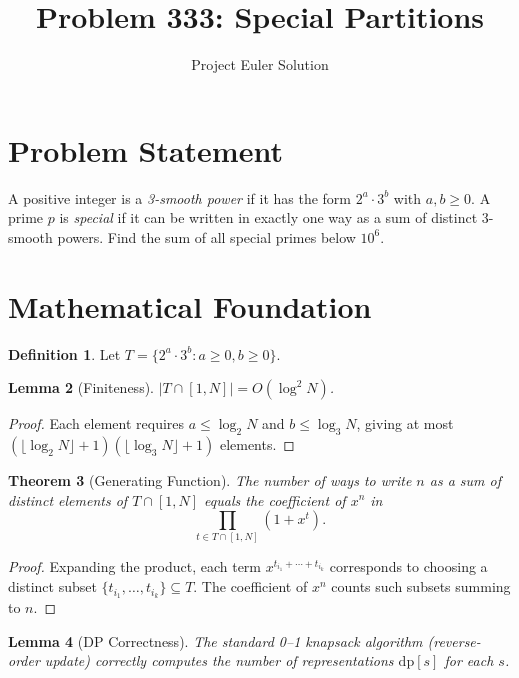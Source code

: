 \documentclass[12pt]{article}
\title{Problem 333: Special Partitions}
\author{Project Euler Solution}
\date{}
\newtheorem{theorem}{Theorem}
\newtheorem{lemma}[theorem]{Lemma}
\theoremstyle{definition}
\newtheorem{definition}[theorem]{Definition}
\begin{document}
\maketitle

\section{Problem Statement}

A positive integer is a \emph{3-smooth power} if it has the form $2^a \cdot 3^b$ with $a, b \ge 0$. A prime $p$ is \emph{special} if it can be written in exactly one way as a sum of distinct 3-smooth powers. Find the sum of all special primes below $10^6$.

\section{Mathematical Foundation}

\begin{definition}
Let $T = \{2^a \cdot 3^b : a \ge 0, b \ge 0\}$.
\end{definition}

\begin{lemma}[Finiteness]
$|T \cap [1, N]| = O(\log^2 N)$.
\end{lemma}

\begin{proof}
Each element requires $a \le \log_2 N$ and $b \le \log_3 N$, giving at most $(\lfloor \log_2 N \rfloor + 1)(\lfloor \log_3 N \rfloor + 1)$ elements.
\end{proof}

\begin{theorem}[Generating Function]
The number of ways to write $n$ as a sum of distinct elements of $T \cap [1,N]$ equals the coefficient of $x^n$ in
\[
\prod_{t \in T \cap [1,N]} (1 + x^t).
\]
\end{theorem}

\begin{proof}
Expanding the product, each term $x^{t_{i_1} + \cdots + t_{i_k}}$ corresponds to choosing a distinct subset $\{t_{i_1}, \ldots, t_{i_k}\} \subseteq T$. The coefficient of $x^n$ counts such subsets summing to $n$.
\end{proof}

\begin{lemma}[DP Correctness]
The standard 0--1 knapsack algorithm (reverse-order update) correctly computes the number of representations $\mathrm{dp}[s]$ for each $s$.
\end{lemma}
\end{document}
